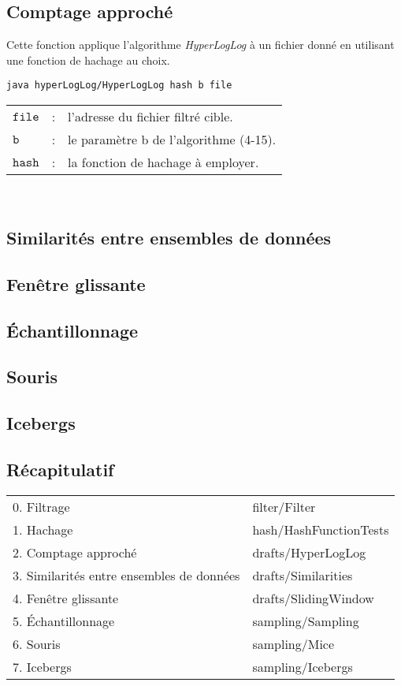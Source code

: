 \documentclass[12pt,a4paper,titlepage]{article}
\newcommand{\class}[1]{$\mathtt{#1}$}
\begin{document}
\subsection{Comptage approché}
Cette fonction applique l'algorithme \emph{HyperLogLog} à un fichier donné en utilisant une fonction de hachage au choix.
\begin{lstlisting}
java hyperLogLog/HyperLogLog hash b file
\end{lstlisting}
\begin{tabular}{lcl}
\class{file} &:& l'adresse du fichier filtré cible.\\
\class{b} &:& le paramètre b de l'algorithme (4-15).\\
\class{hash} &:& la fonction de hachage à employer.
\end{tabular}\\


\subsection{Similarités entre ensembles de données}



\subsection{Fenêtre glissante}

\subsection{Échantillonnage}

\subsection{Souris}

\subsection{Icebergs}

\subsection{Récapitulatif}
\begin{center} \begin{tabular}{ll}
0. Filtrage 		 & filter/Filter \\
1. Hachage 			 & hash/HashFunctionTests \\
2. Comptage approché & drafts/HyperLogLog \\
3. Similarités entre ensembles de données & drafts/Similarities \\
4. Fenêtre glissante & drafts/SlidingWindow \\
5. Échantillonnage 	 & sampling/Sampling \\
6. Souris 			 & sampling/Mice \\
7. Icebergs 		 & sampling/Icebergs
\end{tabular} \end{center}
\end{document}
